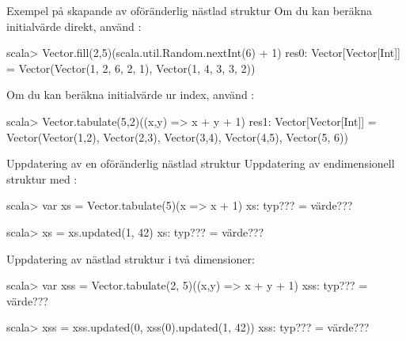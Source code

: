 \begin{Slide}{Exempel på skapande av oföränderlig nästlad struktur}\SlideFontSmall
Om du kan beräkna initialvärde direkt, använd :\\
{\SlideFontTiny{}}
\begin{REPL}
scala> Vector.fill(2,5)(scala.util.Random.nextInt(6) + 1)
res0: Vector[Vector[Int]] =
  Vector(Vector(1, 2, 6, 2, 1), Vector(1, 4, 3, 3, 2))

\end{REPL}
Om du kan beräkna initialvärde ur index, använd :\\
{\SlideFontTiny{}}
\begin{REPL}
scala> Vector.tabulate(5,2)((x,y) => x + y + 1)
res1: Vector[Vector[Int]] =
  Vector(Vector(1,2), Vector(2,3), Vector(3,4), Vector(4,5), Vector(5,	6))

\end{REPL}
\end{Slide}



\begin{Slide}{Uppdatering av en oföränderlig nästlad struktur}\SlideFontSmall
Uppdatering av endimensionell struktur med :\\
{\SlideFontTiny{} }
\begin{REPL}
scala> var xs = Vector.tabulate(5)(x => x + 1)
xs: typ??? = värde???

scala> xs = xs.updated(1, 42)
xs: typ??? = värde???
\end{REPL}

Uppdatering av nästlad struktur i två dimensioner:
\begin{REPL}
scala> var xss = Vector.tabulate(2, 5)((x,y) => x + y + 1)
xss:
  typ??? =
  värde???

scala> xss = xss.updated(0, xss(0).updated(1, 42))
xss:
  typ??? =
  värde???
\end{REPL}

\end{Slide}



